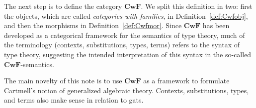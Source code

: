 \documentclass{lmcs}
\def\Cwf{\mathbf{CwF}}
\begin{document}
The next step is to define the category $\Cwf$.
We split this definition in two: first the objects,
which are called \emph{categories with families}, in Definition~\ref{def:Cwfobj},
and then the morphisms in Definition~\ref{def:Cwfmor}.
Since $\Cwf$ has been developed as a categorical framework for the semantics of
type theory, much of the terminology (contexts, substitutions,
types, terms) refers to the syntax of type theory,
suggesting the intended interpretation of this syntax in the
so-called $\Cwf$-semantics.

The main novelty of this note is to use $\Cwf$ as a framework
to formulate Cartmell's notion of generalized algebraic theory.
Contexts, substitutions, types, and terms also make
sense in relation to gats.
\end{document}

